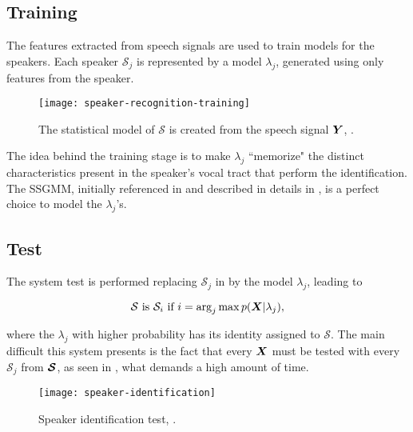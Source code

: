 \subsection{Training}

The features extracted from speech signals are used to train models for the speakers. Each speaker $\mathcal{S}_j$ is represented by a model $\lambda_j$, generated using only features from the speaker.

\begin{figure}[ht]
    \centering
    \texttt{[image: speaker-recognition-training]}
    \caption{The statistical model of $\mathcal{S}$ is created from the speech signal $\boldsymbol{Y}$, .}
    \label{fig:speaker-recognition-training}
\end{figure}

The idea behind the training stage is to make $\lambda_j$ ``memorize" the distinct characteristics present in the speaker's vocal tract that perform the identification. The SSGMM, initially referenced in  and described in details in , is a perfect choice to model the $\lambda_j$'s.

\subsection{Test}

The system test is performed replacing $\mathcal{S}_j$ in  by the model $\lambda_j$, leading to

\begin{equation}
    \mathcal{S} \text{ is } \mathcal{S}_i \text{ if } i = \arg_j\max\postpdf{\boldsymbol{X}}{\lambda_j},
    \label{eq:speaker_identification}
\end{equation}

\noindent where the $\lambda_j$ with higher probability has its identity assigned to $\mathcal{S}$. The main difficult this system presents is the fact that every $\boldsymbol{X}$ must be tested with every $\mathcal{S}_j$ from $\boldsymbol{\mathcal{S}}$, as seen in , what demands a high amount of time.

\begin{figure}[ht]
    \centering
    \texttt{[image: speaker-identification]}
    \caption{Speaker identification test, .}
    \label{fig:speaker_identification}
\end{figure}

